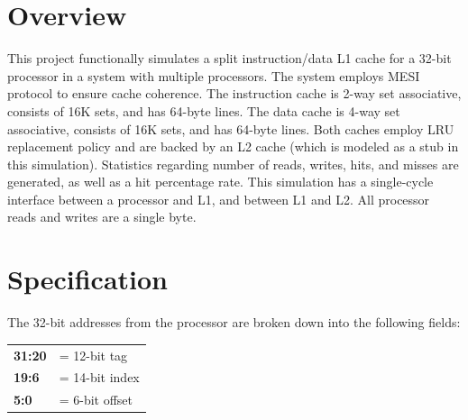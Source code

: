\documentclass{article}
\begin{document}
\newpage


\section{Overview}

This project functionally simulates a split instruction/data L1 cache
for a 32-bit processor in a system with multiple processors.  The
system employs MESI protocol to ensure cache coherence.  The
instruction cache is 2-way set associative, consists of 16K sets, and
has 64-byte lines. The data cache is 4-way set associative, consists
of 16K sets, and has 64-byte lines.  Both caches employ LRU
replacement policy and are backed by an L2 cache (which is modeled as
a stub in this simulation).  Statistics regarding number of reads,
writes, hits, and misses are generated, as well as a hit percentage
rate.  This simulation has a single-cycle interface between a
processor and L1, and between L1 and L2.  All processor reads and
writes are a single byte.


\newpage

\tableofcontents

\newpage

\section{Specification}




The 32-bit addresses from the processor are broken down into the
following fields:

\begin{center}
  \begin{tabular}{ll}
    \textbf{31:20} & = 12-bit tag \\
    \textbf{19:6} & = 14-bit index \\
    \textbf{5:0} & = 6-bit offset
  \end{tabular}
\end{center}
\end{document}
